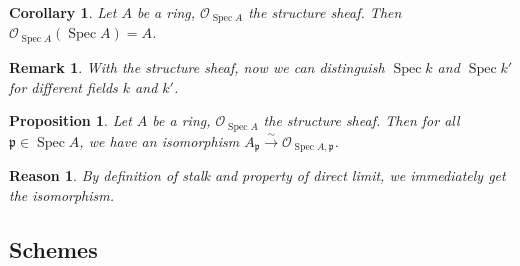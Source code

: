 \documentclass{ctexart}
\newtheorem{remark}{Remark}[section]
\newtheorem{proposition}{Proposition}[section]
\newtheorem{reason}{Reason}[section]
\newtheorem{corollary}{Corollary}[section]
\newcommand{\spec}{\operatorname{Spec}}
\begin{document}
\begin{corollary}
    Let $A$ be a ring, $\mathcal{O}_{\spec A}$ the structure sheaf.
    Then $\mathcal{O}_{\spec A}(\spec A) = A$.
    \label{Corollary 1.2}
\end{corollary}
\begin{remark}
    With the structure sheaf, now we can distinguish $\spec k$ and $\spec k'$ for different fields $k$ and $k'$.
\end{remark}
\begin{proposition}
    Let $A$ be a ring, $\mathcal{O}_{\spec A}$ the structure sheaf.
    Then for all $\mathfrak{p}\in \spec A$, we have an isomorphism $A_{\mathfrak{p}} \overset{\sim}{\longrightarrow} \mathcal{O}_{\spec A, \mathfrak{p}}$.
    \label{Proposition 1.10}
\end{proposition}
\begin{reason}
    By definition of stalk and property of direct limit, we immediately get the isomorphism.
\end{reason}

\subsection{Schemes}
\label{subsection:Schemes_Schemes}
\end{document}
